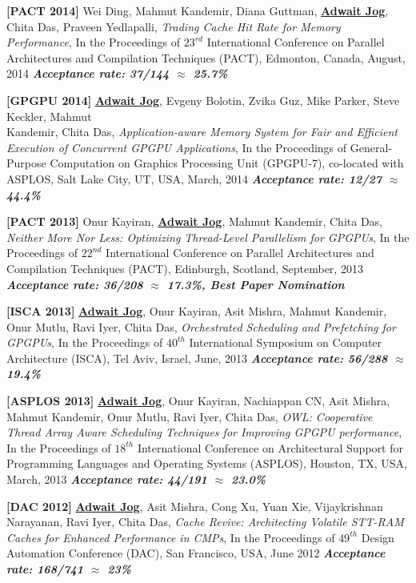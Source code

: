 \documentclass[10pt,a4]{article}
\begin{document}
\begin{description}
\item{\bf [PACT 2014]}
Wei Ding, Mahmut Kandemir, Diana Guttman, {\bf \underline{Adwait Jog}}, Chita Das, Praveen Yedlapalli, 
{\it Trading Cache Hit Rate for Memory Performance}, 
In the Proceedings of $23^{rd}$ International Conference on Parallel Architectures and Compilation Techniques (PACT), 
Edmonton, Canada, August, 2014 
\textbf{\textit{Acceptance rate: 37/144 $\approx$ 25.7\%}}

\item{\bf [GPGPU 2014]}
{\bf \underline{Adwait Jog}}, Evgeny Bolotin, Zvika Guz, Mike Parker, Steve Keckler, Mahmut \\ Kandemir, Chita Das, 
{\it Application-aware Memory System for Fair and Efficient Execution of Concurrent GPGPU Applications}, 
In the Proceedings of General-Purpose Computation on Graphics Processing Unit (GPGPU-7), co-located with ASPLOS, Salt Lake City, UT, USA, March, 2014
\textbf{\textit{Acceptance rate: 12/27 $\approx$ 44.4\%}}

\item{\bf [PACT 2013]}
Onur Kayiran, {\bf \underline{Adwait Jog}}, Mahmut Kandemir, Chita Das,
{\it Neither More Nor Less: Optimizing Thread-Level Parallelism for GPGPUs},
In the Proceedings of $22^{nd}$ International Conference on Parallel Architectures and Compilation Techniques (PACT), 
Edinburgh, Scotland, September, 2013 
\textbf{\textit{Acceptance rate: 36/208 $\approx$ 17.3\%, Best Paper Nomination}}

\item{\bf [ISCA 2013]}
{\bf \underline{Adwait Jog}}, Onur Kayiran, Asit Mishra, Mahmut Kandemir, Onur Mutlu, Ravi Iyer, Chita Das, 
{\it Orchestrated Scheduling and Prefetching for GPGPUs}, 
In the Proceedings of $40^{th}$ International Symposium on Computer Architecture (ISCA), Tel Aviv, Israel, June, 2013
\textbf{\textit{Acceptance rate: 56/288 $\approx$ 19.4\%}}

\item{\bf [ASPLOS 2013]} 
{\bf \underline{Adwait Jog}}, Onur Kayiran, Nachiappan CN, Asit Mishra, Mahmut Kandemir, Onur Mutlu, Ravi Iyer, Chita Das, 
{\it OWL: Cooperative Thread Array Aware Scheduling Techniques for Improving GPGPU performance},
In the Proceedings of $18^{th}$ International Conference on Architectural Support for Programming Languages and Operating Systems (ASPLOS), Houston, TX, USA, March, 2013 
\textbf{\textit{Acceptance rate: 44/191 $\approx$ 23.0\%}}

\item{\bf [DAC 2012]}
{\bf \underline{Adwait Jog}}, Asit Mishra, Cong Xu, Yuan Xie, Vijaykrishnan Narayanan, 
Ravi Iyer, Chita Das, {\it Cache Revive: Architecting Volatile STT-RAM Caches for Enhanced 
Performance in CMPs}, 
In the Proceedings of $49^{th}$ Design Automation Conference (DAC), San Francisco, USA, June 2012
\textbf{\textit{Acceptance rate: 168/741 $\approx$ 23\%}}

\end{description}
\end{document}
